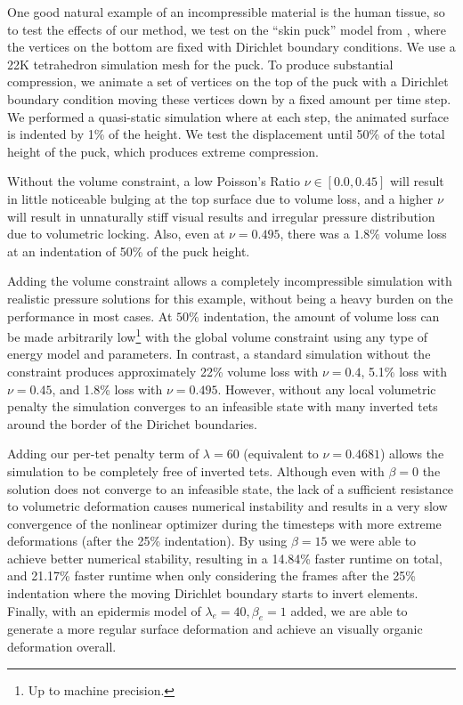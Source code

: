 One good natural example of an incompressible material is the human tissue, so to test the effects of our method, we test on the ``skin puck'' model from \cite{Pai:2018}, where the vertices on the bottom are fixed with Dirichlet boundary conditions. We use a 22K tetrahedron simulation mesh for the puck.  To produce substantial compression, we animate a set of vertices on the top of the puck with a Dirichlet boundary condition moving these vertices down by a fixed amount per time step. We performed a quasi-static simulation where at each step, the animated surface is indented by 1\% of the height. We test the displacement until 50\% of the total height of the puck, which produces extreme compression.

Without the volume constraint, a low Poisson's Ratio $\nu \in [0.0, 0.45]$ will result in little noticeable bulging at the top surface due to volume loss, and a higher $\nu$ will result in unnaturally stiff visual results and irregular pressure distribution due to volumetric locking. Also, even at $\nu = 0.495$, there was a $1.8\%$ volume loss at an indentation of 50\% of the puck height.

Adding the volume constraint allows a completely incompressible simulation with realistic pressure solutions for this example, without being a heavy burden on the performance in most cases. At $50\%$ indentation, the amount of volume loss can be made arbitrarily low\footnote{Up to machine precision.} with the global volume constraint using any type of energy model and parameters. In contrast, a standard simulation without the constraint produces approximately 22\% volume loss with $\nu = 0.4$, 5.1\% loss with $\nu = 0.45$, and 1.8\% loss with $\nu = 0.495$. However, without any local volumetric penalty the simulation converges to an infeasible state with many inverted tets around the border of the Dirichet boundaries.

Adding our per-tet penalty term of $\lambda = 60$ (equivalent to $\nu = 0.4681$) allows the simulation to be completely free of inverted tets. Although even with $\beta = 0$ the solution does not converge to an infeasible state, the lack of a sufficient resistance to volumetric deformation causes numerical instability and results in a very slow convergence of the nonlinear optimizer during the timesteps with more extreme deformations (after the 25\% indentation). By using $\beta = 15$ we were able to achieve better numerical stability, resulting in a 14.84\% faster runtime on total, and 21.17\% faster runtime when only considering the frames after the 25\% indentation where the moving Dirichlet boundary starts to invert elements. Finally, with an epidermis model of $\lambda_e = 40, \beta_e = 1$ added, we are able to generate a more regular surface deformation and achieve an visually organic deformation overall. 

